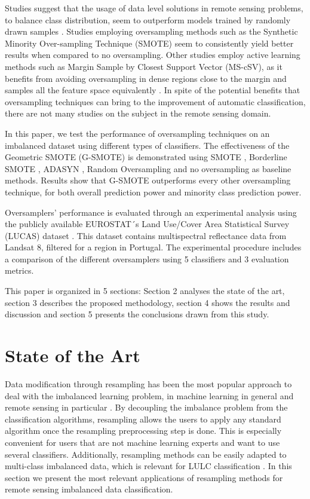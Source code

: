 \documentclass[parskip=full]{scrartcl}
\begin{document}
Studies suggest that the usage of data level solutions in remote sensing
problems, to balance class distribution, seem to outperform models trained by
randomly drawn samples \cite{Wang2019, Mellor2015}.  Studies employing
oversampling methods such as the Synthetic Minority Over-sampling Technique
(SMOTE) \cite{Chawla2002} seem to consistently yield better results
\cite{Johnson2013, Geib2015} when compared to no oversampling. Other studies
employ active learning methods such as Margin Sample by Closest Support Vector
(MS-cSV), as it benefits from avoiding oversampling in dense regions close to
the margin and samples all the feature space equivalently \cite{Tuia2009}. In
spite of the potential benefits that oversampling techniques can bring to the
improvement of automatic classification, there are not many studies on the
subject in the remote sensing domain.

In this paper, we test the performance of oversampling techniques on an
imbalanced dataset using different types of classifiers. The effectiveness of
the Geometric SMOTE (G-SMOTE) \cite{Douzas2019} is demonstrated using SMOTE
\cite{Chawla2002}, Borderline SMOTE \cite{Han2005}, ADASYN \cite{HaiboHe2008},
Random Oversampling and no oversampling as baseline methods. Results show that
G-SMOTE outperforms every other oversampling technique, for both overall
prediction power and minority class prediction power.

Oversamplers' performance is evaluated through an experimental analysis using
the publicly available EUROSTAT´s Land Use/Cover Area Statistical Survey (LUCAS)
dataset \cite{LUCAS2015}. This dataset contains multispectral reflectance data
from Landsat 8, filtered for a region in Portugal. The experimental procedure
includes a comparison of the different oversamplers using 5 classifiers and 3
evaluation metrics.

This paper is organized in 5 sections: Section 2 analyses the state of the art,
section 3 describes the proposed methodology, section 4 shows the results and
discussion and section 5 presents the conclusions drawn from this study.

\section{State of the Art}

Data modification through resampling has been the most popular approach to deal
with the imbalanced learning problem, in machine learning in general
\cite{Douzas2019} and remote sensing in particular \cite{Feng2019}. By
decoupling the imbalance problem from the classification algorithms, resampling
allows the users to apply any standard algorithm once the resampling
preprocessing step is done. This is especially convenient for users that are not
machine learning experts and want to use several classifiers. Additionally,
resampling methods can be easily adapted to multi-class imbalanced data, which
is relevant for LULC classification \cite{Feng2019}. In this section we present
the most relevant applications of resampling methods for remote sensing
imbalanced data classification.
\end{document}
